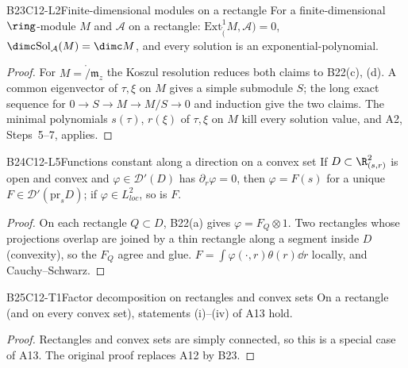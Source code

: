 \begin{dimcard}{B23}{C12-L2}{Finite-dimensional modules on a rectangle}{\proved}{}
For a finite-dimensional $\ring$-module $M$ and $\mathcal A$ on a rectangle: $\mathrm{Ext}^1_\ring(M,\mathcal A)=0$, $\dimc\mathrm{Sol}_{\mathcal A}(M)=\dimc M$, and every solution is an exponential-polynomial.
\end{dimcard}
\begin{proof}
For $M=\ring/\mathfrak m_z$ the Koszul resolution reduces both claims to B22(c), (d).
A common eigenvector of $\tau,\xi$ on $M$ gives a simple submodule $S$; the long exact sequence for $0\to S\to M\to M/S\to0$ and induction give the two claims.
The minimal polynomials $s(\tau)$, $r(\xi)$ of $\tau,\xi$ on $M$ kill every solution value, and A2, Steps~5--7, applies.
\end{proof}

\begin{dimcard}{B24}{C12-L5}{Functions constant along a direction on a convex set}{\proved}{}
If $D\subset\R^2_{(s,r)}$ is open and convex and $\varphi\in\mathcal D'(D)$ has $\partial_r\varphi=0$, then $\varphi=F(s)$ for a unique $F\in\mathcal D'(\mathrm{pr}_sD)$; if $\varphi\in L^2_{loc}$, so is $F$.
\end{dimcard}
\begin{proof}
On each rectangle $Q\subset D$, B22(a) gives $\varphi=F_Q\otimes1$. Two rectangles whose projections overlap are joined by a thin rectangle along a segment inside $D$ (convexity), so the $F_Q$ agree and glue.
$F=\int\varphi(\cdot,r)\theta(r)\dd r$ locally, and Cauchy--Schwarz.
\end{proof}

\begin{dimcard}{B25}{C12-T1}{Factor decomposition on rectangles and convex sets}{\proved}{}
On a rectangle (and on every convex set), statements (i)--(iv) of A13 hold.
\end{dimcard}
\begin{proof}
Rectangles and convex sets are simply connected, so this is a special case of A13. The original proof replaces A12 by B23.
\end{proof}

